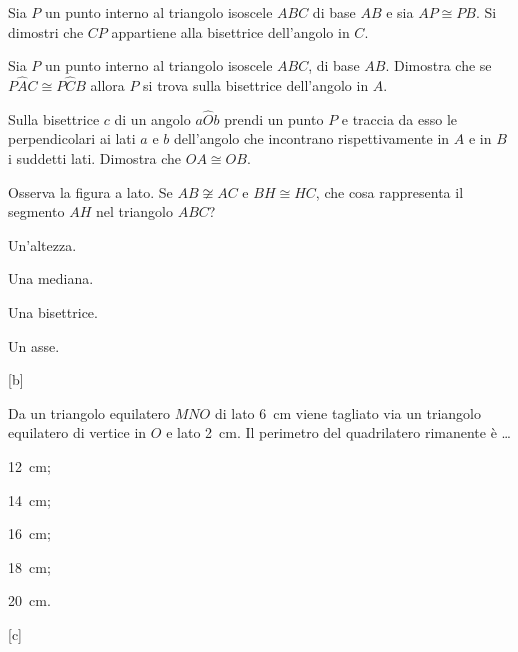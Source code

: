 \begin{multicols}{2}
\begin{esercizio}
Sia \(P\) un punto interno al triangolo isoscele \(ABC\) di base \(AB\) e 
sia \(AP\cong PB\). Si dimostri che \(CP\) appartiene alla bisettrice 
dell'angolo in \(C\).
\end{esercizio}

\begin{esercizio}
Sia \(P\) un punto interno al triangolo isoscele \(ABC\), di base \(AB\). 
Dimostra che se \(P\widehat{A}C\cong P\widehat{C}B\) allora \(P\) si 
trova sulla bisettrice dell'angolo in \(A\).
\end{esercizio}

\begin{esercizio}
Sulla bisettrice \(c\) di un angolo \(a\widehat{O}b\) prendi un punto \(P\) 
e traccia da esso le perpendicolari ai lati \(a\) e \(b\) dell'angolo che 
incontrano rispettivamente in \(A\) e in \(B\) i suddetti lati. Dimostra 
che \(OA\cong OB\).
\end{esercizio}

\end{multicols}

\begin{esercizio}
Osserva la figura a lato. Se \(AB\not\cong AC\) e \(BH\cong HC\), che 
cosa rappresenta il segmento \(AH\) nel triangolo \(ABC\)?\\
\begin{minipage}{.5\linewidth}
\begin{enumeratea}
\item Un'altezza.
\item Una mediana.
\item Una bisettrice.
\item Un asse.
\end{enumeratea}
\end{minipage}\hfil
\begin{minipage}{.2\linewidth}
  \centering
    
\end{minipage}
\hfill[b]
\end{esercizio}

\begin{esercizio}
Da un triangolo equilatero \(MNO\) di lato 6~cm viene tagliato via un 
triangolo equilatero di vertice in \(O\) e lato 2~cm. Il perimetro del 
quadrilatero rimanente è \ldots
\begin{multicols}{5}
\begin{enumeratea}
\item 12~cm;
\item 14~cm;
\item 16~cm;
\item 18~cm;
\item 20~cm.
\end{enumeratea}
\end{multicols}
\hfill[c]
\end{esercizio}
